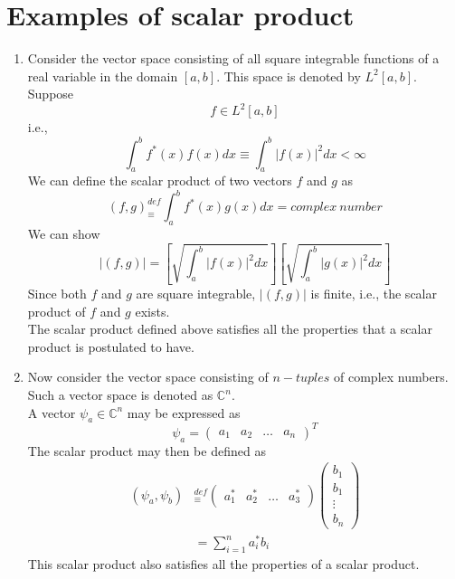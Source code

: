 \section{Examples of scalar product}
\begin{enumerate}[label=\textbf{Example \arabic*},start=1]
	\item 
	Consider the vector space consisting of all square integrable functions of a real variable in the domain $[a,b]$. This space is denoted by $L^2[a,b]$.\\
	Suppose
	\begin{equation}\label{eqn:2.35}
	f \in L^2[a,b]
	\end{equation}
	i.e.,
	\begin{equation}\label{eqn:2.36}
	\int_{a}^{b} f^*(x)f(x) dx \equiv \int_{a}^{b} |f(x)|^2 dx < \infty
	\end{equation}
	We can define the scalar product of two vectors $f$ and $g$ as
	\begin{equation}\label{eqn:2.37}
	(f, g) _\equiv^{def} \int_{a}^{b} f^*(x) g(x) dx = complex \ number
	\end{equation}
	We can show
	\begin{equation}\label{eqn:2.38}
	\left|(f, g)\right| = \left[\sqrt{\int_{a}^{b} |f(x)|^2 dx}\right] \left[\sqrt{\int_{a}^{b} |g(x)|^2 dx}\right]
	\end{equation}
	Since both $f$ and $g$ are square integrable, $|(f, g)|$ is finite, i.e., the scalar product of $f$ and $g$ exists.\\
	The scalar product defined above satisfies all the properties that a scalar product is postulated to have.
	
	
	\item 
	Now consider the vector space consisting of $n-tuples$ of complex numbers. Such a vector space is denoted as $\mathbb{C}^n$.\\
	A vector $\psi_a \in \mathbb{C}^n$ may be expressed as
	\begin{equation}\label{eqn:2.39}
	\psi_a = \left(
	\begin{matrix}
	a_1 & a_2 & \ldots & a_n
	\end{matrix}
	\right)^T
	\end{equation}
	The scalar product may then be defined as
	\begin{eqnarray}\label{eqn:2.40-2.41}
		(\psi_a , \psi_b) &_\equiv^{def} \left(
		\begin{matrix}
			a_1^* & a_2^* & \ldots &  a_3^*
		\end{matrix}
		\right)\left(
		\begin{matrix}
			b_1 \\ b_1 \\ \vdots \\ b_n
		\end{matrix}
		\right)\\
		&= \sum_{i=1}^{n} a_i^* b_i
	\end{eqnarray}
	This scalar product also satisfies all the properties of a scalar product.
	

\end{enumerate}
